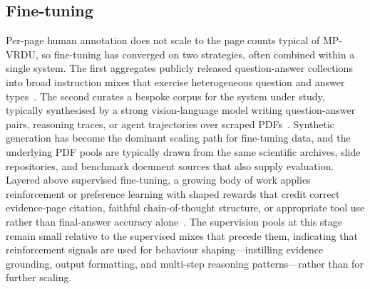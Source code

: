 \documentclass[11pt]{article}
\begin{document}
\subsection{Fine-tuning}
\label{sec:data-ft}
Per-page human annotation does not scale to the page counts typical of MP-VRDU, so fine-tuning has converged on two strategies, often combined within a single system. The first aggregates publicly released question-answer collections into broad instruction mixes that exercise heterogeneous question and answer types~\cite{tanaka2024instructdoc,jia2024leopard,hu2025mplug2,duan2025docopilot}. The second curates a bespoke corpus for the system under study, typically synthesised by a strong vision-language model writing question-answer pairs, reasoning traces, or agent trajectories over scraped PDFs~\cite{xie2024wukong,tanaka2025vdocrag,wu2025molorag,zhang2026docdancer,guo2026end}. Synthetic generation has become the dominant scaling path for fine-tuning data, and the underlying PDF pools are typically drawn from the same scientific archives, slide repositories, and benchmark document sources that also supply evaluation. Layered above supervised fine-tuning, a growing body of work applies reinforcement or preference learning with shaped rewards that credit correct evidence-page citation, faithful chain-of-thought structure, or appropriate tool use rather than final-answer accuracy alone~\cite{xiong2026docr1,guo2026endtoend,yan2025docseeker,lin2026mmdocr1,xu2026mmr5,wang2026vragrl}. The supervision pools at this stage remain small relative to the supervised mixes that precede them, indicating that reinforcement signals are used for behaviour shaping---instilling evidence grounding, output formatting, and multi-step reasoning patterns---rather than for further scaling.
\end{document}
